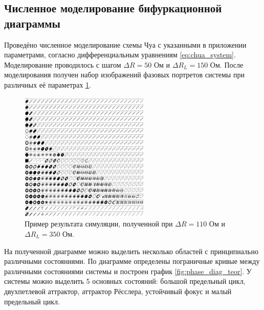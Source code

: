 \documentclass[12pt]{article}
\begin{document}
\subsection*{Численное моделирование бифуркационной диаграммы}
Проведёно численное моделирование схемы Чуа с указанными в приложении параметрами, согласно дифференциальным уравнениям \ref{eq:chua_system}. 
Моделирование проводилось с шагом $\Delta R = 50$ Ом и $\Delta R_L = 150$ Ом. После моделирования получен набор 
изображений фазовых портретов системы при различных её параметрах \ref{fig:simulation}.
\begin{figure}[H]
	\centering
	\includegraphics[width=0.55\textwidth]{sim_ex.png}
	\caption{Пример результата симуляции, полученной при $\Delta R = 110$ Ом и $\Delta R_L = 350$ Ом.}
	\label{fig:simulation}
\end{figure}
На полученной диаграмме можно выделить несколько областей с принципиально различными состояниями. 
По диаграмме определены пограничные кривые между различными состояниями системы и построен график \ref{fig:phase_diag_teor}. 
У системы можно выделить 5 основных состояний: большой предельный цикл, двухпетлевой аттрактор, аттрактор Рёсслера, устойчивый фокус и 
малый предельный цикл. 
\end{document}
